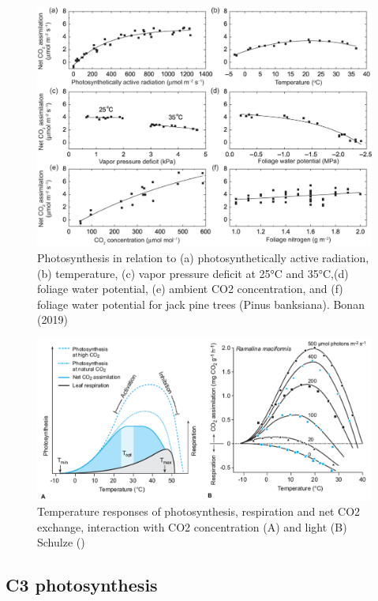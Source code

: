 \documentclass[
  oneside]{book}
\begin{document}
\begin{figure}

{\centering \includegraphics[width=0.8\linewidth]{figures/chap2/photosynthesis_obs} 

}

\caption{Photosynthesis in relation to (a) photosynthetically active radiation,(b) temperature, (c) vapor pressure deficit at 25°C and 35°C,(d) foliage water potential, (e) ambient CO2 concentration, and (f) foliage water potential for jack pine trees (Pinus banksiana). Bonan (2019)}\label{fig:f22}
\end{figure}

\begin{figure}

{\centering \includegraphics[width=0.8\linewidth]{figures/chap2/Trespons_interactions} 

}

\caption{Temperature responses of photosynthesis, respiration and net CO2 exchange, interaction with CO2 concentration (A) and light  (B)  Schulze ()}\label{fig:f23}
\end{figure}

\hypertarget{c3-photosynthesis}{%
\subsection{C3 photosynthesis}\label{c3-photosynthesis}}
\end{document}
